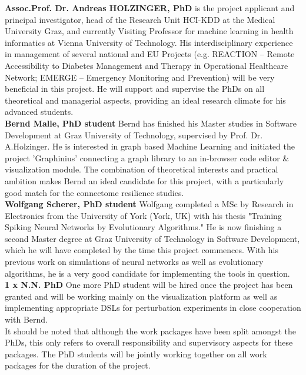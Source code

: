 \documentclass[a4paper,11pt]{article}
\begin{document}
\textbf{Assoc.Prof. Dr. Andreas HOLZINGER, PhD} is the project applicant and principal investigator, head of the Research Unit HCI-KDD at the Medical University Graz, and currently Visiting Professor for machine learning in health informatics at Vienna University of Technology. His interdisciplinary experience in management of several national and EU Projects (e.g. REACTION – Remote Accessibility to Diabetes Management and Therapy in Operational Healthcare Network; EMERGE – Emergency Monitoring and Prevention) will be very beneficial in this project. He will support and supervise the PhDs on all theoretical and managerial aspects, providing an ideal research climate for his advanced students.
\\[0,2cm]
\textbf{Bernd Malle, PhD student}
Bernd has finished his Master studies in Software Development at Graz University of Technology, supervised by Prof. Dr. A.Holzinger. He is interested in graph based Machine Learning and initiated the project 'Graphinius' connecting a graph library to an in-browser code editor \& visualization module. The combination of theoretical interests and practical ambition makes Bernd an ideal candidate for this project, with a particularly good match for the connectome resilience studies.
\\[0,2cm]
\textbf{Wolfgang Scherer, PhD student}
Wolfgang completed a MSc by Research in Electronics from the University of York (York, UK) with his thesis "Training Spiking Neural Networks by Evolutionary Algorithms." He is now finishing a second Master degree at Graz University of Technology in Software Development, which he will have completed by the time this project commences. With his previous work on simulations of neural networks as well as evolutionary algorithms, he is a very good candidate for implementing the tools in question.
\\[0,2cm]
\textbf{1 x N.N. PhD} One more PhD student will be hired once the project has been granted and will be working mainly on the visualization platform as well as implementing appropriate DSLs for perturbation experiments in close cooperation with Bernd.
\\[0,2cm]
It should be noted that although the work packages have been split amongst the PhDs, this only refers to overall responsibility and supervisory aspects for these packages. The PhD students will be jointly working together on all work packages for the duration of the project.

\end{document}
